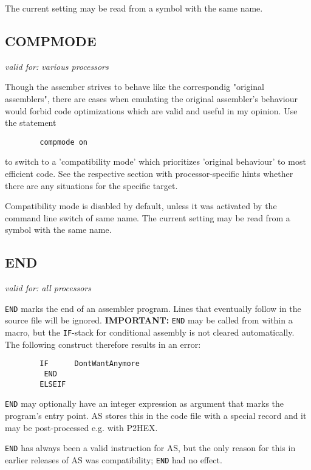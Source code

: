 \documentclass[12pt,twoside]{report}
\makeatletter
\newcommand{\bb}[1]{{\bf #1}}
\newcommand{\tty}[1]{{\tt #1}}
\newcommand{\ttindex}[1]{\index{#1@{\tt #1}}}
\makeatother
\begin{document}
The current setting may be read from a symbol with the same name.


\subsection{COMPMODE}
\label{SectCompMode}
\ttindex{COMPMODE}

{\em valid for: various processors}

Though the assember strives to behave like the correspondig "original
assemblers", there are cases when emulating the original assembler's
behaviour would forbid code optimizations which are valid and useful in
my opinion.  Use the statement
\begin{verbatim}
        compmode on
\end{verbatim}
to switch to a 'compatibility mode' which prioritizes 'original behaviour'
to most efficient code.  See the respective section with processor-specific
hints whether there are any situations for the specific target.
\par
Compatibility mode is disabled by default, unless it was activated by the
command line switch of same name.  The current setting may be read from a
symbol with the same name.


\subsection{END}
\ttindex{END}

{\em valid for: all processors}

\tty{END} marks the end of an assembler program.  Lines that eventually
follow in the source file will be ignored.  \bb{IMPORTANT:} \tty{END} may
be called from within a macro, but the \tty{IF}-stack for conditional
assembly is not cleared automatically.  The following construct therefore
results in an error:
\begin{verbatim}
        IF      DontWantAnymore
         END
        ELSEIF
\end{verbatim}
\tty{END} may optionally have an integer expression as argument that marks
the program's entry point.  AS stores this in the code file with a special
record and it may be post-processed e.g. with P2HEX.

\tty{END} has always been a valid instruction for AS, but the only reason
for this in earlier releases of AS was compatibility; \tty{END} had no
effect.
\end{document}
